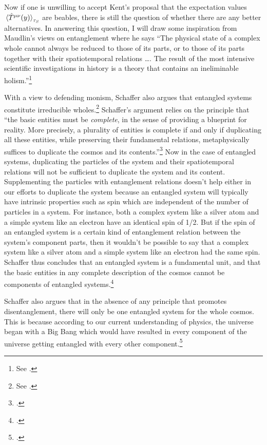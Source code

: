 Now if one is unwilling to accept Kent's proposal that the expectation values $\ev*{\hat{T}^{\mu\nu}(y)}_{\tau_S}$ are beables, there is still the question of whether there are any better alternatives. In answering this question, I will  draw some inspiration from Maudlin's views on entanglement where he says ``The physical state of a complex whole cannot always be reduced to those of its parts, or to those of its parts together with their spatiotemporal relations \ldots. The result of the most intensive scientific investigations in history is a theory that contains an ineliminable holism.''\footnote{See \cite[56]{Maudlin2}.}  

With a view to defending monism, Schaffer also argues that entangled systems constitute irreducible wholes.\footnote{See \cite{SchafferJonathan2010MTPo}.} Schaffer's argument relies on the principle that ``the basic entities must be \emph{complete}, in the sense of providing a blueprint for reality. More precisely, a plurality of entities is complete if and only if duplicating all these entities, while preserving their fundamental relations, metaphysically suffices to duplicate the cosmos and its contents.''\footnote{\cite[39]{SchafferJonathan2010MTPo}.} Now in the case of entangled systems, duplicating the particles of the system and their spatiotemporal relations will not be sufficient to duplicate the system and its content. Supplementing the particles with entanglement relations doesn't help either in our efforts to duplicate the system because an entangled system will typically have intrinsic properties such as spin which are independent of the number of particles in a system. For instance, both a complex system like a silver atom and a simple system like an electron have an identical spin of 1/2. But if the spin of an entangled system is a certain kind of entanglement relation between the system's component parts, then it wouldn't be possible to say that a complex system like a silver atom and a simple system like an electron had the same spin. Schaffer thus concludes that an entangled system is a fundamental unit, and that the basic entities in any complete description of the cosmos cannot be components of entangled systems.\footnote{\cite[54]{SchafferJonathan2010MTPo}.}  

Schaffer also argues that in the absence of any principle that promotes disentanglement, there will only be one entangled system for the whole cosmos. This is because according to our current understanding of physics, the universe began with a Big Bang which would have resulted in every component of the universe getting entangled with every other component.\footnote{\cite[52]{SchafferJonathan2010MTPo}.}  

